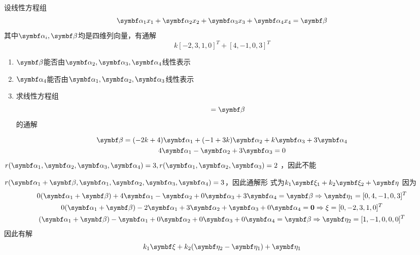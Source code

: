\documentclass{article}
\begin{document}
\begin{examplle}[]
设线性方程组
\begin{equation*}
\balpha_1x_1+\balpha_2x_2+\balpha_3x_3+\balpha_4x_4=\bbeta
\end{equation*}
其中\(\balpha_i,\bbeta\)均是四维列向量，有通解
\begin{equation*}
k[-2,3,1,0]^T+[4,-1,0,3]^T
\end{equation*}
\begin{enumerate}
\item \(\bbeta\)能否由\(\balpha_2,\balpha_3,\balpha_4\)线性表示
\item \(\balpha_4\)能否由\(\balpha_1,\balpha_2,\balpha_3\)线性表示
\item 求线性方程组
\begin{equation*}
[\balpha_1+\bbeta,\balpha_1,\balpha_2,\balpha_3,\balpha_4]=\bbeta
\end{equation*}
的通解
\end{enumerate}


\begin{gather*}
\bbeta=(-2k+4)\balpha_1+(-1+3k)\balpha_2+k\balpha_3+3\balpha_4\\
4\balpha_1-\balpha_2+3\balpha_3=0
\end{gather*}
\(r(\balpha_1,\balpha_2,\balpha_3,\balpha_4)=3,r(\balpha_1,\balpha_2,\balpha_3)=2\)
，因此不能

\(r(\balpha_1+\bbeta,\balpha_1,\balpha_2,\balpha_3,\balpha_4)=3\)，因此通解形
式为\(k_1\bxi_1+k_2\bxi_2+\boldeta\)
因为
\begin{gather*}
0(\balpha_1+\bbeta)+4\balpha_1-\balpha_2+0\balpha_3+3\balpha_4=\bbeta\Rightarrow
\boldeta_1=[0,4,-1,0,3]^T\\
0(\balpha_1+\bbeta)-2\balpha_1+3\balpha_2+\balpha_3+0\balpha_4=\bzero\Rightarrow
\xi=[0,-2,3,1,0]^T\\
(\balpha_1+\bbeta)-\balpha_1+0\balpha_2+0\balpha_3+0\balpha_4=\bbeta\Rightarrow
\boldeta_2=[1,-1,0,0,0]^T\\
\end{gather*}
因此有解
\begin{equation*}
k_1\bxi+k_2(\boldeta_2-\boldeta_1)+\boldeta_1
\end{equation*}
\end{examplle}
\end{document}

